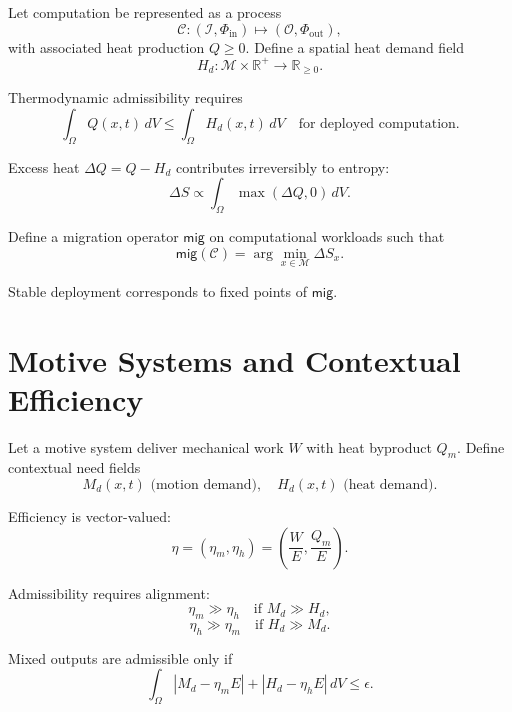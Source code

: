 \documentclass[12pt,oneside]{book}
\begin{document}
Let computation be represented as a process
\[
\mathcal{C} : (\mathcal{I}, \Phi_{\text{in}}) \mapsto (\mathcal{O}, \Phi_{\text{out}}),
\]
with associated heat production \(Q \ge 0\).
Define a spatial heat demand field
\[
H_d : \mathcal{M} \times \mathbb{R}^+ \to \mathbb{R}_{\ge 0}.
\]

Thermodynamic admissibility requires
\begin{equation}
\int_\Omega Q(x,t)\, dV \le \int_\Omega H_d(x,t)\, dV
\quad \text{for deployed computation}.
\end{equation}

Excess heat \(\Delta Q = Q - H_d\) contributes irreversibly to entropy:
\begin{equation}
\Delta S \propto \int_\Omega \max(\Delta Q,0)\, dV.
\end{equation}

Define a migration operator \(\mathsf{mig}\) on computational workloads such that
\begin{equation}
\mathsf{mig}(\mathcal{C}) = \arg\min_{x \in \mathcal{M}} \Delta S_x.
\end{equation}

Stable deployment corresponds to fixed points of \(\mathsf{mig}\).

\chapter{Motive Systems and Contextual Efficiency}

Let a motive system deliver mechanical work \(W\) with heat byproduct \(Q_m\).
Define contextual need fields
\[
M_d(x,t) \text{ (motion demand)}, \quad H_d(x,t) \text{ (heat demand)}.
\]

Efficiency is vector-valued:
\begin{equation}
\eta = (\eta_m,\eta_h) = \left(\frac{W}{E}, \frac{Q_m}{E}\right).
\end{equation}

Admissibility requires alignment:
\begin{equation}
\eta_m \gg \eta_h \quad \text{if } M_d \gg H_d,
\end{equation}
\begin{equation}
\eta_h \gg \eta_m \quad \text{if } H_d \gg M_d.
\end{equation}

Mixed outputs are admissible only if
\begin{equation}
\int_\Omega |M_d - \eta_m E| + |H_d - \eta_h E|\, dV \le \epsilon.
\end{equation}
\end{document}
